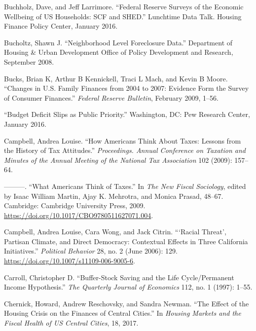 \documentclass[12pt,oneside]{psthesis}
\begin{document}
\leavevmode\hypertarget{ref-buchholz2016federal}{}%
Buchholz, Dave, and Jeff Larrimore. ``Federal Reserve Surveys of the Economic Wellbeing of US Households: SCF and SHED.'' Lunchtime Data Talk. Housing Finance Policy Center, January 2016.

\leavevmode\hypertarget{ref-bucholtz2008neighborhood}{}%
Bucholtz, Shawn J. ``Neighborhood Level Foreclosure Data.'' Department of Housing \& Urban Development Office of Policy Development and Research, September 2008.

\leavevmode\hypertarget{ref-bucks2009changes}{}%
Bucks, Brian K, Arthur B Kennickell, Traci L Mach, and Kevin B Moore. ``Changes in U.S. Family Finances from 2004 to 2007: Evidence Form the Survey of Consumer Finances.'' \emph{Federal Reserve Bulletin}, February 2009, 1--56.

\leavevmode\hypertarget{ref-2016budget}{}%
``Budget Deficit Slips as Public Priority.'' Washington, DC: Pew Research Center, January 2016.

\leavevmode\hypertarget{ref-campbell2009how}{}%
Campbell, Andrea Louise. ``How Americans Think About Taxes: Lessons from the History of Tax Attitudes.'' \emph{Proceedings. Annual Conference on Taxation and Minutes of the Annual Meeting of the National Tax Association} 102 (2009): 157--64.

\leavevmode\hypertarget{ref-campbell2009what}{}%
---------. ``What Americans Think of Taxes.'' In \emph{The New Fiscal Sociology}, edited by Isaac William Martin, Ajay K. Mehrotra, and Monica Prasad, 48--67. Cambridge: Cambridge University Press, 2009. \url{https://doi.org/10.1017/CBO9780511627071.004}.

\leavevmode\hypertarget{ref-campbell2006racial}{}%
Campbell, Andrea Louise, Cara Wong, and Jack Citrin. ```Racial Threat', Partisan Climate, and Direct Democracy: Contextual Effects in Three California Initiatives.'' \emph{Political Behavior} 28, no. 2 (June 2006): 129. \url{https://doi.org/10.1007/s11109-006-9005-6}.

\leavevmode\hypertarget{ref-carroll1997bufferstock}{}%
Carroll, Christopher D. ``Buffer-Stock Saving and the Life Cycle/Permanent Income Hypothesis.'' \emph{The Quarterly Journal of Economics} 112, no. 1 (1997): 1--55.

\leavevmode\hypertarget{ref-chernick2017effect}{}%
Chernick, Howard, Andrew Reschovsky, and Sandra Newman. ``The Effect of the Housing Crisis on the Finances of Central Cities.'' In \emph{Housing Markets and the Fiscal Health of US Central Cities}, 18, 2017.
\end{document}
